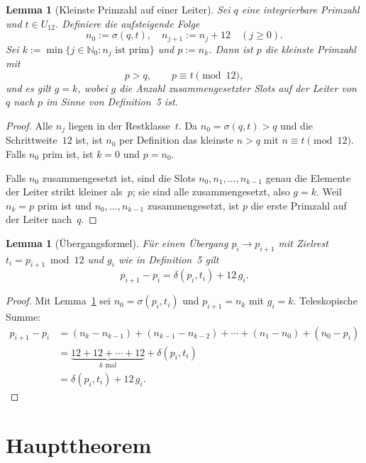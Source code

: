 \documentclass[11pt,a4paper]{article}
\newtheorem{lemma}[theorem]{Lemma}
\newcommand{\N}{\mathbb{N}}
\begin{document}
\begin{lemma}[Kleinste Primzahl auf einer Leiter]
\label{lem:next-prime-on-ladder}
Sei $q$ eine integrierbare Primzahl und $t \in U_{12}$.
Definiere die aufsteigende Folge
\[
  n_0 := \sigma(q,t),\quad
  n_{j+1} := n_j + 12 \quad (j \ge 0).
\]
Sei $k := \min\{ j \in \N_0 : n_j \text{ ist prim}\}$ und $p := n_k$.
Dann ist $p$ die kleinste Primzahl mit
\[
  p > q,\qquad p \equiv t \pmod{12},
\]
und es gilt $g = k$, wobei $g$ die Anzahl zusammengesetzter Slots auf der Leiter
von $q$ nach $p$ im Sinne von Definition~5 ist.
\end{lemma}

\begin{proof}
Alle $n_j$ liegen in der Restklasse~$t$.
Da $n_0 = \sigma(q,t) > q$ und die Schrittweite~$12$ ist, ist $n_0$ per
Definition das kleinste $n > q$ mit $n \equiv t \pmod{12}$.
Falls $n_0$ prim ist, ist $k=0$ und $p = n_0$.

Falls $n_0$ zusammengesetzt ist, sind die Slots $n_0,n_1,\ldots,n_{k-1}$
genau die Elemente der Leiter strikt kleiner als~$p$; sie sind alle
zusammengesetzt, also $g = k$.
Weil $n_k = p$ prim ist und $n_0,\ldots,n_{k-1}$ zusammengesetzt, ist $p$ die
erste Primzahl auf der Leiter nach~$q$.
\end{proof}

\begin{lemma}[Übergangsformel]
\label{lem:transition-formula}
Für einen Übergang $p_i \to p_{i+1}$ mit Zielrest $t_i = p_{i+1}\bmod 12$
und $g_i$ wie in Definition~5 gilt
\[
  p_{i+1} - p_i = \delta(p_i,t_i) + 12\,g_i.
\]
\end{lemma}

\begin{proof}
Mit Lemma~\ref{lem:next-prime-on-ladder} sei $n_0 = \sigma(p_i,t_i)$ und
$p_{i+1} = n_k$ mit $g_i = k$.
Teleskopische Summe:
\begin{align*}
  p_{i+1} - p_i
  &= (n_k - n_{k-1}) + (n_{k-1} - n_{k-2}) + \cdots + (n_1 - n_0) + (n_0 - p_i)\\
  &= \underbrace{12 + 12 + \cdots + 12}_{k\text{ mal}} + \delta(p_i,t_i)\\
  &= \delta(p_i,t_i) + 12\,g_i.
\end{align*}
\end{proof}

\section{Haupttheorem}
\end{document}
